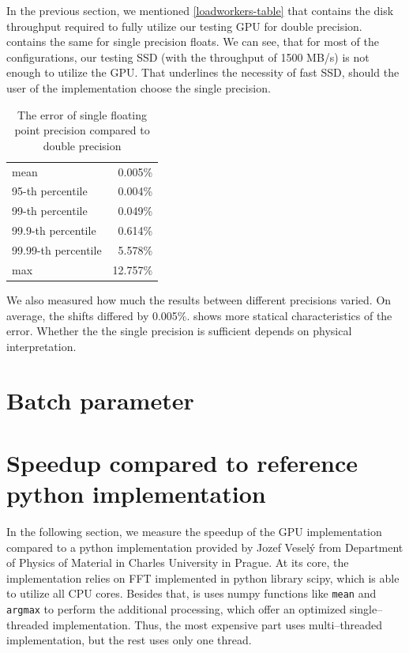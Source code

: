 In the previous section, we mentioned \cref{loadworkers-table} that contains the disk throughput required to fully utilize our testing GPU for double precision.   contains the same for single precision floats. We can see, that for most of the configurations, our testing SSD (with the throughput of 1500 MB/s) is not enough to utilize the GPU. That underlines the necessity of fast SSD, should the user of the implementation choose the single precision.



\begin{table}[]
	\centering
	\begin{tabular}{@{}l|r@{}}
		mean               & 0.005\% \\
		95-th percentile   & 0.004\% \\
		99-th percentile   & 0.049\% \\
		99.9-th percentile & 0.614\% \\
		99.99-th percentile & 5.578\% \\
		max                &  12.757\%
	\end{tabular}
	\caption{The error of single floating point precision compared to double precision}
	\label{float-error}
\end{table}

We also measured how much the results between different precisions varied. On average, the shifts differed by 0.005\%.  shows more statical characteristics of the error. Whether the the single precision is sufficient depends on physical interpretation.


\section{Batch parameter}
\label{batch-param-eval}




\section{Speedup compared to reference python implementation}

In the following section, we measure the speedup of the GPU implementation compared to a python implementation provided by Jozef Veselý from Department of Physics of Material in Charles University in Prague. At its core, the implementation relies on FFT implemented in python library scipy, which is able to utilize all CPU cores. Besides that, is uses numpy functions like \texttt{mean} and \texttt{argmax} to perform the additional processing, which offer an optimized single--threaded implementation. Thus, the most expensive part uses multi--threaded implementation, but the rest uses only one thread.






